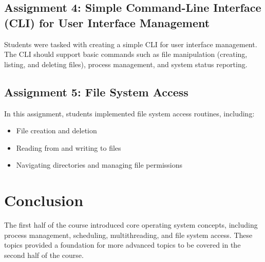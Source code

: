 \documentclass[12pt]{article}
\begin{document}
\subsection{Assignment 4: Simple Command-Line Interface (CLI) for User Interface Management}
Students were tasked with creating a simple CLI for user interface management. The CLI should support basic commands such as file manipulation (creating, listing, and deleting files), process management, and system status reporting.

\subsection{Assignment 5: File System Access}
In this assignment, students implemented file system access routines, including:
\begin{itemize}
    \item File creation and deletion
    \item Reading from and writing to files
    \item Navigating directories and managing file permissions
\end{itemize}

\section{Conclusion}
The first half of the course introduced core operating system concepts, including process management, scheduling, multithreading, and file system access. These topics provided a foundation for more advanced topics to be covered in the second half of the course.



\end{document}
